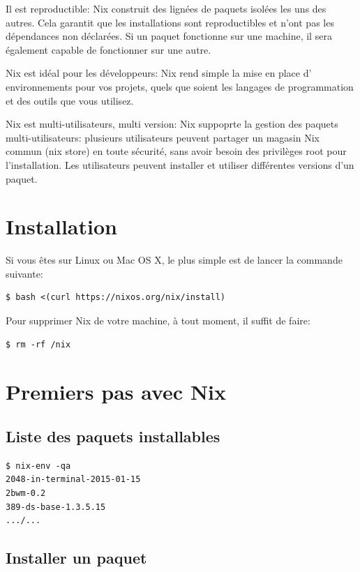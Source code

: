 \documentclass[final]{beamer}
\begin{document}
\begin{frame}[fragile]
\begin{multicols}{3}
\vspace{0.5cm}
Il est reproductible: Nix construit des lignées de paquets isolées les uns des autres. Cela garantit que les installations sont reproductibles et n'ont pas les dépendances non déclarées. Si un paquet fonctionne sur une machine, il sera également capable de fonctionner sur une autre.

\vspace{0.5cm}
Nix est idéal pour les développeurs: Nix rend simple la mise en place d' environnements pour vos projets, quels que soient les langages de programmation et des outils que vous utilisez.

\vspace{0.5cm}
Nix est multi-utilisateurs, multi version: Nix suppoprte la gestion des paquets multi-utilisateurs: plusieurs utilisateurs peuvent partager un magasin Nix commun (nix store) en toute sécurité, sans avoir besoin des privilèges root pour l'installation. Les utilisateurs peuvent installer et utiliser différentes versions d'un paquet.

\section{Installation}
Si vous êtes sur Linux ou Mac OS X, le plus simple est de lancer la commande suivante:

\begin{verbatim}
$ bash <(curl https://nixos.org/nix/install)    
\end{verbatim}

Pour supprimer Nix de votre machine, à tout moment, il suffit de faire:
\begin{verbatim}
$ rm -rf /nix
\end{verbatim}

\section{Premiers pas avec Nix}

\subsection{Liste des paquets installables}
\begin{verbatim}
$ nix-env -qa
2048-in-terminal-2015-01-15
2bwm-0.2
389-ds-base-1.3.5.15
.../...
\end{verbatim}

\subsection{Installer un paquet}


\end{multicols}
\end{frame}
\end{document}
